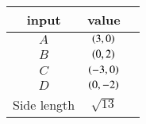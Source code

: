 \begin{tabular}[10pt]{ |c| c| c|}
    \hline
    \textbf{input} & \textbf{value}\\ 
    \hline
    $A$ &$\left(3,0\right)$\\
    \hline 
    $B$ &$\left(0,2\right)$\\
    \hline 
    $C$&$\left(-3,0\right)$\\
    \hline
    $D$&$\left(0,-2\right)$\\
    \hline
    Side length&$\sqrt{13}$\\
    \hline
    \end{tabular}
